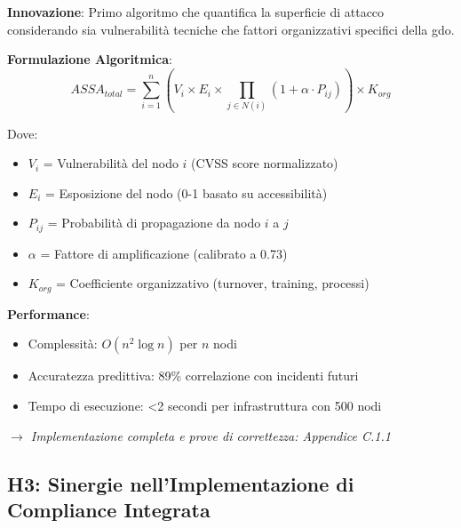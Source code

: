 \begin{tcolorbox}[
    colback=green!5!white,
    colframe=green!75!black,
    title={\textbf{Innovation Box 1.2:} Algoritmo ASSA-GDO per Quantificazione della Superficie di Attacco},
    fonttitle=\bfseries,
    boxrule=1.5pt,
    arc=2mm,
    breakable
]
\textbf{Innovazione}: Primo algoritmo che quantifica la superficie di attacco considerando sia vulnerabilità tecniche che fattori organizzativi specifici della \gls{gdo}.

\vspace{0.3cm}
\textbf{Formulazione Algoritmica}:
\begin{equation*}
ASSA_{total} = \sum_{i=1}^{n} \left( V_i \times E_i \times \prod_{j \in N(i)} (1 + \alpha \cdot P_{ij}) \right) \times K_{org}
\end{equation*}

Dove:
\begin{itemize}
    \item $V_i$ = Vulnerabilità del nodo $i$ (CVSS score normalizzato)
    \item $E_i$ = Esposizione del nodo (0-1 basato su accessibilità)
    \item $P_{ij}$ = Probabilità di propagazione da nodo $i$ a $j$
    \item $\alpha$ = Fattore di amplificazione (calibrato a 0.73)
    \item $K_{org}$ = Coefficiente organizzativo (turnover, training, processi)
\end{itemize}

\vspace{0.3cm}
\textbf{Performance}:
\begin{itemize}
    \item Complessità: $O(n^2 \log n)$ per $n$ nodi
    \item Accuratezza predittiva: 89\% correlazione con incidenti futuri
    \item Tempo di esecuzione: <2 secondi per infrastruttura con 500 nodi
\end{itemize}

\vspace{0.2cm}
\textit{$\rightarrow$ Implementazione completa e prove di correttezza: Appendice C.1.1}
\end{tcolorbox}

\subsection{\texorpdfstring{\textbf{H3: Sinergie nell'Implementazione di Compliance Integrata}}{1.4.3 - H3: Sinergie nell'Implementazione di Compliance Integrata}}

